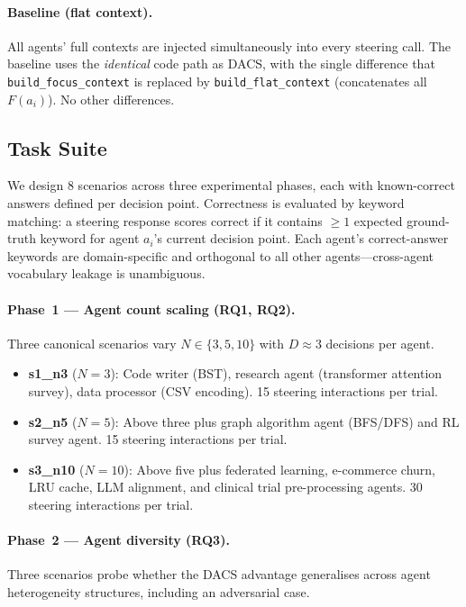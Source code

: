 \documentclass{article}
\begin{document}
\paragraph{Baseline (flat context).} All agents' full contexts are
injected simultaneously into every steering call.
The baseline uses the \emph{identical} code path as DACS, with the single
difference that \texttt{build\_focus\_context} is replaced by
\texttt{build\_flat\_context} (concatenates all $F(a_i)$).
No other differences.

\subsection{Task Suite}
\label{sec:tasks}

We design 8 scenarios across three experimental phases,
each with known-correct answers defined per decision point.
Correctness is evaluated by keyword matching: a steering response scores
correct if it contains $\geq 1$ expected ground-truth keyword for agent
$a_i$'s current decision point.
Each agent's correct-answer keywords are domain-specific and orthogonal
to all other agents—cross-agent vocabulary leakage is unambiguous.

\paragraph{Phase~1 — Agent count scaling (RQ1, RQ2).}
Three canonical scenarios vary $N \in \{3, 5, 10\}$ with $D \approx 3$
decisions per agent.

\begin{itemize}
  \item \textbf{s1\_n3} ($N=3$): Code writer (BST), research agent
  (transformer attention survey), data processor (CSV encoding).
  15 steering interactions per trial.

  \item \textbf{s2\_n5} ($N=5$): Above three plus graph algorithm agent
  (BFS/DFS) and RL survey agent.
  15 steering interactions per trial.

  \item \textbf{s3\_n10} ($N=10$): Above five plus federated learning,
  e-commerce churn, LRU cache, LLM alignment, and clinical trial
  pre-processing agents.
  30 steering interactions per trial.
\end{itemize}

\paragraph{Phase~2 — Agent diversity (RQ3).}
Three scenarios probe whether the DACS advantage generalises across
agent heterogeneity structures, including an adversarial case.
\end{document}
